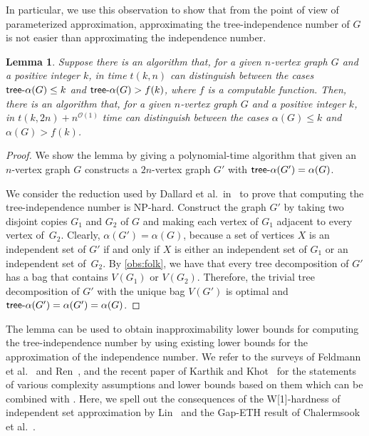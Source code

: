 \documentclass[11pt]{article}
\newtheorem{lemma}{Lemma}[section]
\theoremstyle{definition}
\newcommand{\tin}{\mathsf{tree} \textnormal{-} \alpha}
\newcommand{\NP}{\textup{\textsf{NP}}}
\newcommand{\OO}{\mathcal{O}}
\newcommand{\W}{\textup{\textsf{W[1]}}}
\begin{document}
In particular, we use this observation to show that from the point of view of parameterized approximation, approximating the tree-independence number of $G$ is not easier than approximating the independence number.


\begin{lemma}\label{lem:inappr}
Suppose there is an algorithm that, for a given $n$-vertex graph $G$ and a positive integer $k$, in time $t(k,n)$ can distinguish between the cases $\tin(G) \le k$ and $\tin(G) > f(k)$, where $f$ is a computable function.
Then, there is an algorithm that, for a given $n$-vertex graph $G$ and a positive integer $k$, in $t(k,2n) + n^{\OO(1)}$ time can distinguish between the cases $\alpha(G) \le k$ and $\alpha(G) > f(k)$.
\end{lemma}

\begin{proof}
We show the lemma by giving a polynomial-time algorithm that given an $n$-vertex graph $G$ constructs a $2n$-vertex graph $G'$ with $\tin(G') = \alpha(G)$.

We consider the reduction used by Dallard et al.\ in~\cite{DallardMS24} to prove that computing the tree-independence number is \NP-hard.
Construct the graph $G'$ by taking two disjoint copies $G_1$ and $G_2$ of $G$ and making each vertex of $G_1$ adjacent to every vertex of~$G_2$. Clearly, $\alpha(G')=\alpha(G)$, because a set of vertices $X$ is an independent set of $G'$ if and only if $X$ is either an independent set of $G_1$ or an independent set of~$G_2$.
By \cref{obs:folk}, we have that every tree decomposition of $G'$ has a bag that contains $V(G_1)$ or $V(G_2)$. Therefore, the trivial tree decomposition of $G'$ with the unique bag $V(G')$ is optimal and $\tin(G')=\alpha(G')=\alpha(G)$.
\end{proof}

The lemma can be used to obtain inapproximability lower bounds for computing the tree-independence number by using existing lower bounds for the approximation of the independence number.
We refer to the surveys of Feldmann et al.~\cite{FeldmannSLM20} and Ren~\cite{Ren21}, and the recent paper of Karthik and Khot~\cite{KarthikK21} for the statements of various complexity assumptions and lower bounds based on them which can be combined with .
Here, we spell out the consequences of the \W-hardness of independent set approximation by Lin~\cite{Lin21} and the {\sf Gap-ETH} result of Chalermsook et al.~\cite{DBLP:journals/siamcomp/ChalermsookCKLM20}.
\end{document}
